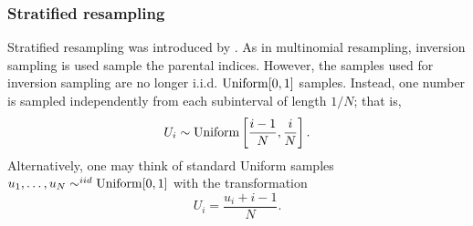 


\subsubsection{Stratified resampling}
Stratified resampling was introduced by \textcite{kitagawa1996}.
As in multinomial resampling, inversion sampling is used sample the parental indices. However, the samples used for inversion sampling are no longer i.i.d. $\operatorname{Uniform}[0,1]$ samples. Instead, one number is sampled independently from each subinterval of length $1/N$; that is, 
\begin{equation*}
U_i \sim \operatorname{Uniform} \left[\frac{i-1}{N}, \frac{i}{N} \right] .
\end{equation*}
Alternatively, one may think of standard Uniform samples $u_1,\dots,u_N \sim^{iid} \operatorname{Uniform}[0,1]$ with the transformation
\begin{equation*}
U_i = \frac{u_i + i -1}{N} .
\end{equation*}

